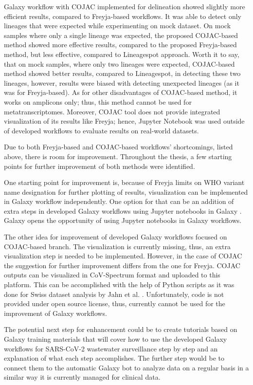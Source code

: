 Galaxy workflow with COJAC implemented for delineation showed slightly more efficient results, compared to Freyja-based workflows. It was able to detect only lineages that were expected while experimenting on mock dataset. On mock samples where only a single lineage was expected, the proposed COJAC-based method showed more effective results, compared to the proposed Freyja-based method, but less effective, compared to Lineagespot approach. Worth it to say, that on mock samples, where only two lineages were expected, COJAC-based method showed better results, compared to Lineagespot, in detecting these two lineages, however, results were biased with detecting unexpected lineages (as it was for Freyja-based). As for other disadvantages of COJAC-based method, it works on amplicons only; thus, this method cannot be used for metatranscriptomes. Moreover, COJAC tool does not provide integrated visualization of its results like Freyja; hence, Jupyter Notebook was used outside of developed workflows to evaluate results on real-world datasets.

Due to both Freyja-based and COJAC-based workflows' shortcomings, listed above, there is room for improvement. Throughout the thesis, a few starting points for further improvement of both methods were identified.

One starting point for improvement is, because of Freyja limits on WHO variant name designation for further plotting of results, visualization can be implemented in Galaxy workflow independently. One option for that can be an addition of extra steps in developed Galaxy workflows using Jupyter notebooks in Galaxy \cite{galaxyjupyter,batut2018}. Galaxy opens the opportunity of using Jupyter notebooks in Galaxy workflows. 

The other idea for improvement of developed Galaxy workflows focused on COJAC-based branch. The visualization is currently missing, thus, an extra visualization step is needed to be implemented. However, in the case of COJAC the suggestion for further improvement differs from the one for Freyja. COJAC outputs can be visualized in CoV-Spectrum \cite{chen2022b} format and uploaded to this platform. This can be accomplished with the help of Python scripts as it was done for Swiss dataset analysis by Jahn et al. \cite{jahn2022,swisscovspectrum}. Unfortunately, code is not provided under open source license, thus, currently cannot be used for the improvement of Galaxy workflows. 

The potential next step for enhancement could be to create tutorials based on Galaxy training materials \cite{batut2018} that will cover how to use the developed Galaxy workflows for SARS-CoV-2 wastewater surveillance step by step and an explanation of what each step accomplishes. The further step would be to connect them to the automatic Galaxy bot to analyze data on a regular basis in a similar way it is currently managed for clinical data.

